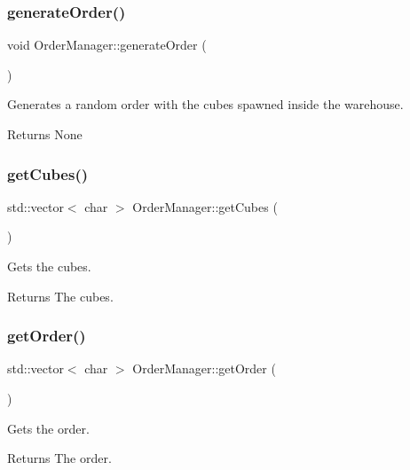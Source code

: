 \subsubsection{\texorpdfstring{generate\+Order()}{generateOrder()}}
{\footnotesize\ttfamily void Order\+Manager\+::generate\+Order (\begin{DoxyParamCaption}{ }\end{DoxyParamCaption})}



Generates a random order with the cubes spawned inside the warehouse. 

\begin{DoxyReturn}{Returns}
None 
\end{DoxyReturn}
\mbox{\label{class_order_manager_a3bc1147e66d4521ac19e57ee4ce78e4a}} 
\subsubsection{\texorpdfstring{get\+Cubes()}{getCubes()}}
{\footnotesize\ttfamily std\+::vector$<$ char $>$ Order\+Manager\+::get\+Cubes (\begin{DoxyParamCaption}{ }\end{DoxyParamCaption})}



Gets the cubes. 

\begin{DoxyReturn}{Returns}
The cubes. 
\end{DoxyReturn}
\mbox{\label{class_order_manager_a678b21719b2fc90aec2b5e6f2b2bc85e}} 
\subsubsection{\texorpdfstring{get\+Order()}{getOrder()}}
{\footnotesize\ttfamily std\+::vector$<$ char $>$ Order\+Manager\+::get\+Order (\begin{DoxyParamCaption}{ }\end{DoxyParamCaption})}



Gets the order. 

\begin{DoxyReturn}{Returns}
The order. 
\end{DoxyReturn}
\mbox{\label{class_order_manager_a24f95bf83688b34fe3d9c1b9a3704c03}} 
